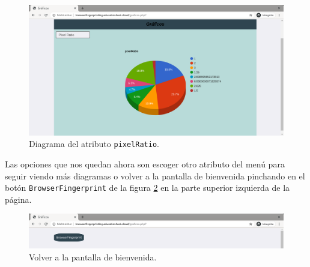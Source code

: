 \begin{figure}[tbp]
	\centering
	\includegraphics[width=1\textwidth]{Images/pixelRatioChart.png}
	\caption{Diagrama del atributo \texttt{pixelRatio}.}
	\label{fig:pixelRatioChart}
\end{figure}

Las opciones que nos quedan ahora son escoger otro atributo del menú para seguir viendo más diagramas o volver a la pantalla de bienvenida pinchando en el botón \texttt{BrowserFingerprint} de la figura \ref{fig:wellcomeBoton} en la parte superior izquierda de la página.

\begin{figure}[tbp]
	\centering
	\includegraphics[width=1\textwidth]{Images/wellcomeBoton.png}
	\caption{Volver a la pantalla de bienvenida.}
	\label{fig:wellcomeBoton}
\end{figure}


